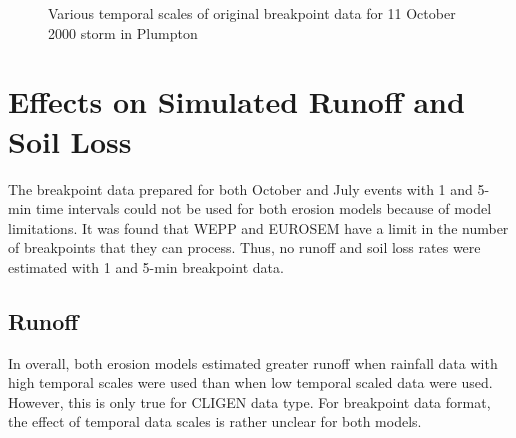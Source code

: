 \begin{figure}[htbp]
    \qquad
  \caption{Various temporal scales of original breakpoint data for 11 October
2000 storm in Plumpton}
  \label{fig:pl_storm}
\end{figure}

\section{Effects on Simulated Runoff and Soil Loss}
\label{sec:TemporalScalesSimulatedRunoffAndSoilLoss}

The breakpoint data prepared for both October and July events with 1 and 5-min
time intervals could not be used for both erosion models because of model
limitations. It was found that WEPP and EUROSEM have a limit in the number of
breakpoints that they can process. Thus, no runoff and soil loss rates were
estimated with 1 and 5-min breakpoint data.

\subsection{Runoff}
\label{sec:TemporalScalesSimulatedRunoff}

In overall, both erosion models estimated greater runoff when rainfall data
with high temporal scales were used than when low temporal scaled data were
used. However, this is only true for CLIGEN data type. For breakpoint data
format, the effect of temporal data scales is rather unclear for both models.

